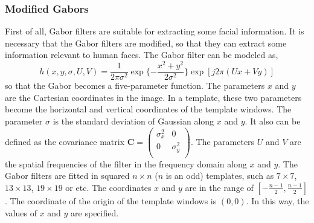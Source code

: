 \subsubsection{Modified Gabors}
First of all, Gabor filters are suitable for extracting some facial information. It is necessary that the Gabor filters are modified, so that they can extract some information relevant to human faces. The Gabor filter can be modeled as,
\begin{equation}
 h(x,y,\sigma,U,V)=\frac{1}{2\pi\sigma^2}\exp\{-\frac{x^2+y^2}{2\sigma^2}\}\exp[j2\pi(Ux+Vy)]
\end{equation}
so that the Gabor becomes a five-parameter function. The parameters $x$ and $y$ are the Cartesian coordinates in the image. In a template, these two parameters become the horizontal and vertical coordinates of the template windows. The parameter $\sigma$ is the standard deviation of Gaussian along $x$ and $y$. It also can be defined as the covariance matrix $ \mathbf{C} = \left( \begin{array}{cc}
             \sigma_x^2 & 0 \\
	     0 & \sigma_y^2 \\
            \end{array} \right)$. 
The parameters $U$ and $V$ are the spatial frequencies of the filter in the frequency domain along $x$ and $y$. The Gabor filters are fitted in squared $n\times n$ ($n$ is an odd) templates, such as $7\times 7$, $13\times 13$, $19\times 19$ or etc. The coordinates $x$ and $y$ are in the range of $[-\frac{n-1}{2},\frac{n-1}{2}]$. The coordinate of the origin of the template windows is $(0,0)$. In this way, the values of $x$ and $y$ are specified.

